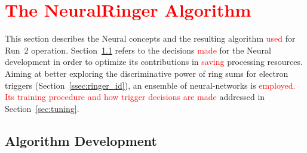 \chapter{\textcolor{red}{The NeuralRinger Algorithm}}%
\label{sec:neuralringer}

This section describes the Neural\rnn{} concepts and the resulting algorithm \textcolor{red}{used} for Run~2
operation.  Section~\ref{ssec:rnn_for_online_and_eletrons} refers to the
decisions \textcolor{red}{made} for the Neural\rnn{} development in order to optimize its contributions in \textcolor{red}{saving} processing resources. Aiming at better exploring the discriminative
power of ring sums for electron triggers (Section~\ref{ssec:ringer_id}),
an ensemble of neural-networks is \textcolor{red}{employed.  Its training procedure and how trigger decisions are made} addressed in Section~\ref{sec:tuning}.

\section{Algorithm Development}\label{ssec:rnn_for_online_and_eletrons}



